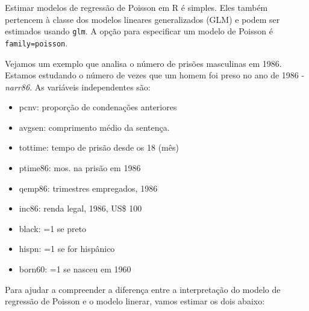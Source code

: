 \documentclass[
  letterpaper,
  DIV=11,
  numbers=noendperiod]{scrreprt}
\providecommand{\tightlist}{%
  \setlength{\itemsep}{0pt}\setlength{\parskip}{0pt}}
\begin{document}
Estimar modelos de regressão de Poisson em R é simples. Eles também
pertencem à classe dos modelos lineares generalizados (GLM) e podem ser
estimados usando \texttt{glm}. A opção para especificar um modelo de
Poisson é \texttt{family=poisson}.

Vejamos um exemplo que analisa o número de prisões masculinas em 1986.
Estamos estudando o número de vezes que um homem foi preso no ano de
1986 - \emph{narr86}. As variáveis independentes são:

\begin{itemize}
\tightlist
\item
  pcnv: proporção de condenações anteriores
\item
  avgsen: comprimento médio da sentença.
\item
  tottime: tempo de prisão desde os 18 (mês)
\item
  ptime86: mos. na prisão em 1986
\item
  qemp86: trimestres empregados, 1986
\item
  inc86: renda legal, 1986, US\$ 100
\item
  black: =1 se preto
\item
  hispn: =1 se for hispânico
\item
  born60: =1 se nasceu em 1960
\end{itemize}

Para ajudar a compreender a diferença entre a interpretação do modelo de
regressão de Poisson e o modelo linerar, vamos estimar os dois abaixo:
\end{document}
